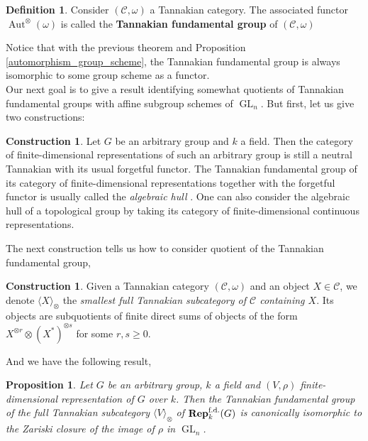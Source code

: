 \documentclass{article}
\theoremstyle{plain}
\newtheorem{proposition}[theorem]{Proposition}
\theoremstyle{definition}
\newtheorem{definition}[theorem]{Definition}
\newtheorem{construction}[theorem]{Construction}
\DeclareMathOperator{\Aut}{Aut}
\DeclareMathOperator{\GL}{GL}
\DeclareMathOperator{\Rep}{\bf{Rep}}
\begin{document}
\begin{definition}
    Consider $(\mathcal{C},\omega)$ a Tannakian category. The associated functor $\Aut^{\otimes}(\omega)$ is called the \textbf{Tannakian fundamental group} of $(\mathcal{C},\omega)$
\end{definition}

\noindent Notice that with the previous theorem and Proposition \ref{automorphism_group_scheme}, the Tannakian fundamental group is always isomorphic to some group scheme as a functor.\\

\noindent Our next goal is to give a result identifying somewhat quotients of Tannakian fundamental groups with affine subgroup schemes of $\GL_n$.
But first, let us give two constructions:
\begin{construction}
\label{construction_algebraic_hull}
    Let $G$ be an arbitrary group and $k$ a field. 
    Then the category of finite-dimensional representations of such an arbitrary group is still a neutral Tannakian with its usual forgetful functor.
    The Tannakian fundamental group of its category of finite-dimensional representations together with the forgetful functor is usually called the \textit{algebraic hull} .
    One can also consider the algebraic hull of a topological group by taking its category of finite-dimensional continuous representations.
\end{construction}

\noindent The next construction tells us how to consider quotient of the Tannakian fundamental group,
\begin{construction}
    Given a Tannakian category $(\mathcal{C},\omega)$ and an object $X\in \mathcal{C}$, we denote $\langle X\rangle_{\otimes}$ the \textit{smallest full Tannakian subcategory of $\mathcal{C}$ containing $X$}.
    Its objects are subquotients of finite direct sums of objects of the form $X^{\otimes r}\otimes (X^*)^{\otimes s}$ for some $r,s\geq 0$.
\end{construction}

\noindent And we have the following result,

\begin{proposition}
\label{Tannaka_subcat_Zariski_closure}
    Let $G$ be an arbitrary group, $k$ a field and $(V,\rho)$ finite-dimensional representation of $G$ over $k$.
    Then the Tannakian fundamental group of the full Tannakian subcategory $\langle V\rangle_{\otimes}$ of $\Rep^{\text{f.d.}}_k(G)$ is canonically isomorphic to the Zariski closure of the image of $\rho$ in $\GL_n$.
\end{proposition}
\end{document}
